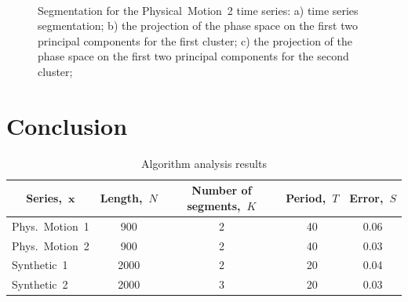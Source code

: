 \documentclass[12pt, twoside]{article}
\numberwithin{equation}{section}
\begin{document}
\begin{figure}[h!t]\center
{}
\\
\caption{Segmentation for the Physical~Motion~2 time series: 
a) time series segmentation; b) the projection of the phase space on the first two principal components for the first cluster; c) the projection of the phase space on the first two principal components for the second cluster;}
\label{fig_real_segmentation}
\end{figure}

\section{Conclusion}
\begin{table}[h!t]
\begin{center}
\caption{Algorithm analysis results}
\label{table_2}
\begin{tabular}{|c|c|c|c|c|}
\hline
	Series,~$\textbf{x}$ & Length,~$N$& Number of segments,~$K$& Period,~$T$& Error,~$S$\\
	\hline
	\multicolumn{1}{|l|}{Phys.~Motion~1}
	& 900& 2& 40& 0.06\\
	\hline
	\multicolumn{1}{|l|}{Phys.~Motion~2}
	& 900& 2& 40& 0.03\\
	\hline
	\multicolumn{1}{|l|}{Synthetic~1}
	& 2000& 2& 20& 0.04\\
	\hline
	\multicolumn{1}{|l|}{Synthetic~2}
	& 2000& 3& 20& 0.03\\
\hline

\end{tabular}
\end{center}
\end{table}
\end{document}
